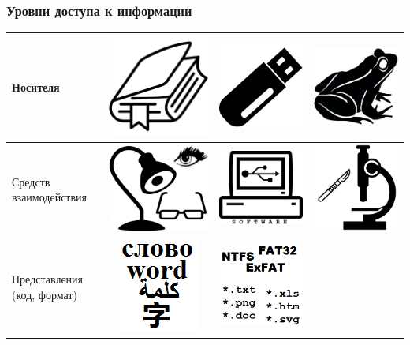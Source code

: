 \begin{frame}
    \frametitle{Уровни доступа к информации}
    
    \begin{center}
        \begin{tabular}[c]{l|c|c|c|}
            \hline
            Носителя 
                & \includegraphics[width=.12\textwidth]{fig/book}
                    & \includegraphics[width=.12\textwidth]{fig/flash}
                        & \includegraphics[width=.12\textwidth]{fig/frog}
                            \\ \hline
            Средств взаимодействия
                & \includegraphics[width=.12\textwidth]{fig/book-tool}
                    & \includegraphics[width=.12\textwidth]{fig/flash-tool}
                        & \includegraphics[width=.12\textwidth]{fig/frog-tool}
                            \\ \hline
            Представления (код, формат)
                & \includegraphics[width=.12\textwidth]{fig/book-code}
                    & \includegraphics[width=.12\textwidth]{fig/flash-code}

\end{tabular}
\end{center}
\end{frame}

